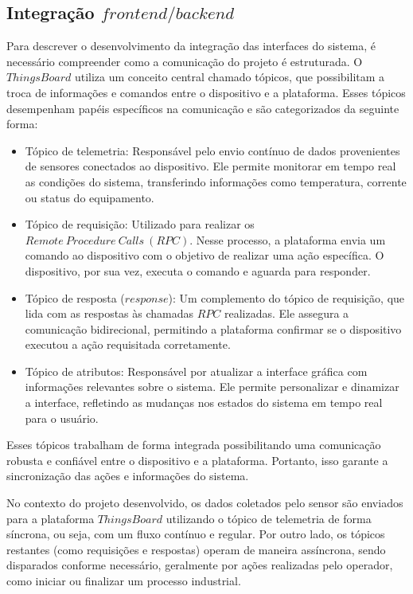 \documentclass{ecatfg}
\begin{document}
\subsection{Integração $frontend/backend$}
\label{SeçãoIV4}
Para descrever o desenvolvimento da integração das interfaces do sistema, é necessário compreender como a comunicação do projeto é estruturada. O $ThingsBoard$ utiliza um conceito central chamado tópicos, que possibilitam a troca de informações e comandos entre o dispositivo e a plataforma. Esses tópicos desempenham papéis específicos na comunicação e são categorizados da seguinte forma: \par 

\begin{itemize}
\item Tópico de telemetria: Responsável pelo envio contínuo de dados provenientes de sensores conectados ao dispositivo. Ele permite monitorar em tempo real as condições do sistema, transferindo informações como temperatura, corrente ou status do equipamento.
\item Tópico de requisição: Utilizado para realizar os $Remote\ Procedure\ Calls\ (RPC)$. Nesse processo, a plataforma envia um comando ao dispositivo com o objetivo de realizar uma ação específica. O dispositivo, por sua vez, executa o comando e aguarda para responder.
\item Tópico de resposta ($response$): Um complemento do tópico de requisição, que lida com as respostas às chamadas $RPC$ realizadas. Ele assegura a comunicação bidirecional, permitindo a plataforma confirmar se o dispositivo executou a ação requisitada corretamente.
\item Tópico de atributos: Responsável por atualizar a interface gráfica com informações relevantes sobre o sistema. Ele permite personalizar e dinamizar a interface, refletindo as mudanças nos estados do sistema em tempo real para o usuário.
\end{itemize}

Esses tópicos trabalham de forma integrada possibilitando uma comunicação robusta e confiável entre o dispositivo e a plataforma. Portanto, isso garante a sincronização das ações e informações do sistema. \par

No contexto do projeto desenvolvido, os dados coletados pelo sensor são enviados para a plataforma $ThingsBoard$ utilizando o tópico de telemetria de forma síncrona, ou seja, com um fluxo contínuo e regular. Por outro lado, os tópicos restantes (como requisições e respostas) operam de maneira assíncrona, sendo disparados conforme necessário, geralmente por ações realizadas pelo operador, como iniciar ou finalizar um processo industrial. \par
\end{document}
